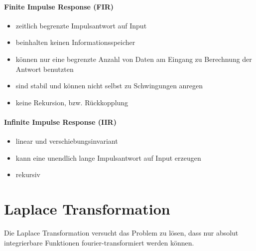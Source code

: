 \documentclass[12pt,a4paper]{article}
\begin{document}
\paragraph{Finite Impulse Response (FIR)}
\hspace{1pt}
\begin{itemize}
\item zeitlich begrenzte Impulsantwort auf Input
\item beinhalten keinen Informationsspeicher
\item können nur eine begrenzte Anzahl von Daten am Eingang zu Berechnung der Antwort benutzten
\item sind stabil und können nicht selbst zu Schwingungen anregen
\item keine Rekursion, bzw. Rückkopplung
\end{itemize}

\paragraph{Infinite Impulse Response (IIR)}
\hspace{1pt}
\begin{itemize}
\item linear und verschiebungsinvariant
\item kann eine unendlich lange Impulsantwort auf Input erzeugen
\item rekursiv
\end{itemize}

\section{Laplace Transformation}
Die Laplace Transformation versucht das Problem zu lösen, dass nur absolut integrierbare Funktionen fourier-transformiert werden können.
\end{document}
